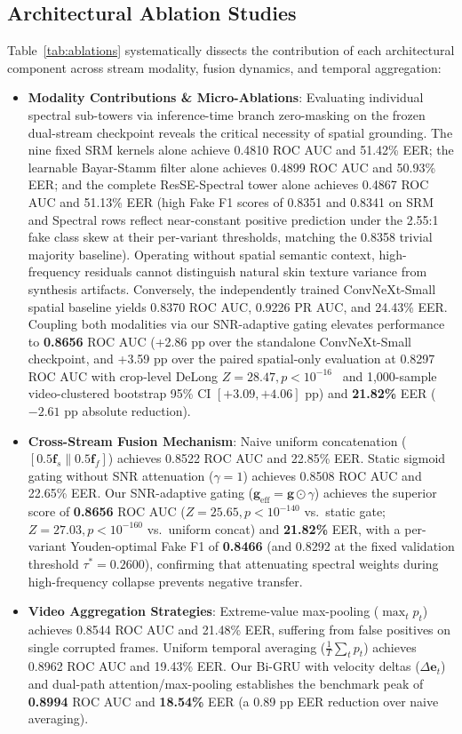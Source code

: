 \documentclass[10pt,twocolumn,letterpaper]{article}
\begin{document}
\subsection{Architectural Ablation Studies}
\label{sec:exp_ablations}

Table~\ref{tab:ablations} systematically dissects the contribution of each architectural component across stream modality, fusion dynamics, and temporal aggregation:
\begin{itemize}
\item \textbf{Modality Contributions \& Micro-Ablations}: Evaluating individual spectral sub-towers via inference-time branch zero-masking on the frozen dual-stream checkpoint reveals the critical necessity of spatial grounding. The nine fixed SRM kernels alone achieve 0.4810 ROC AUC and 51.42\% EER; the learnable Bayar-Stamm filter alone achieves 0.4899 ROC AUC and 50.93\% EER; and the complete ResSE-Spectral tower alone achieves 0.4867 ROC AUC and 51.13\% EER (high Fake F1 scores of 0.8351 and 0.8341 on SRM and Spectral rows reflect near-constant positive prediction under the 2.55:1 fake class skew at their per-variant thresholds, matching the 0.8358 trivial majority baseline). Operating without spatial semantic context, high-frequency residuals cannot distinguish natural skin texture variance from synthesis artifacts. Conversely, the independently trained ConvNeXt-Small spatial baseline yields 0.8370 ROC AUC, 0.9226 PR AUC, and 24.43\% EER. Coupling both modalities via our SNR-adaptive gating elevates performance to \textbf{0.8656} ROC AUC (+2.86 pp over the standalone ConvNeXt-Small checkpoint, and +3.59 pp over the paired spatial-only evaluation at 0.8297 ROC AUC with crop-level DeLong $Z = 28.47, p < 10^{-16}$~\cite{delong1988comparing} and 1,000-sample video-clustered bootstrap 95\% CI $[+3.09, +4.06]$ pp) and \textbf{21.82\%} EER ($-2.61$ pp absolute reduction).
\item \textbf{Cross-Stream Fusion Mechanism}: Naive uniform concatenation ($[0.5\mathbf{f}_s \parallel 0.5\mathbf{f}_f]$) achieves 0.8522 ROC AUC and 22.85\% EER. Static sigmoid gating without SNR attenuation ($\gamma = 1$) achieves 0.8508 ROC AUC and 22.65\% EER. Our SNR-adaptive gating ($\mathbf{g}_{\mathrm{eff}} = \mathbf{g} \odot \gamma$) achieves the superior score of \textbf{0.8656} ROC AUC ($Z = 25.65, p < 10^{-140}$ vs.\ static gate; $Z = 27.03, p < 10^{-160}$ vs.\ uniform concat) and \textbf{21.82\%} EER, with a per-variant Youden-optimal Fake F1 of \textbf{0.8466} (and 0.8292 at the fixed validation threshold $\tau^* = 0.2600$), confirming that attenuating spectral weights during high-frequency collapse prevents negative transfer.
\item \textbf{Video Aggregation Strategies}: Extreme-value max-pooling ($\max_t p_t$) achieves 0.8544 ROC AUC and 21.48\% EER, suffering from false positives on single corrupted frames. Uniform temporal averaging ($\frac{1}{T}\sum_t p_t$) achieves 0.8962 ROC AUC and 19.43\% EER. Our Bi-GRU with velocity deltas ($\Delta \mathbf{e}_t$) and dual-path attention/max-pooling establishes the benchmark peak of \textbf{0.8994} ROC AUC and \textbf{18.54\%} EER (a 0.89 pp EER reduction over naive averaging).
\end{itemize}
\end{document}
